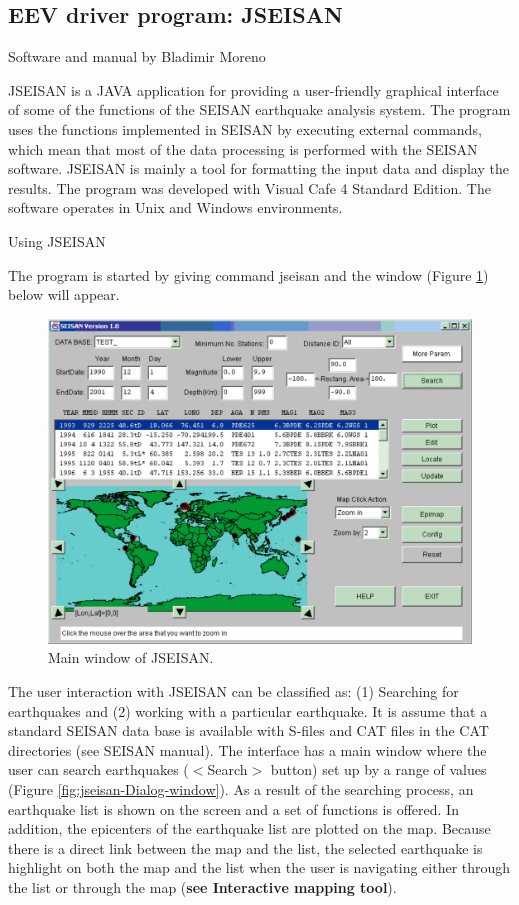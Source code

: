 \subsection{EEV driver program: JSEISAN}

Software and manual by Bladimir Moreno 

JSEISAN is a JAVA application for providing a user-friendly graphical interface of some of the functions of the SEISAN earthquake analysis system. The program uses the functions implemented in SEISAN by executing external commands, which mean that most of the data processing is performed with the SEISAN software. JSEISAN is mainly a tool for formatting the input data and display the results. The program was developed with Visual Cafe 4 Standard Edition. The software operates in Unix and Windows environments. 

Using JSEISAN 

The program is started by giving command jseisan and the window 
(Figure \ref{fig:jseisan}) below will appear. 

\begin{figure}
\centerline{\includegraphics[width=0.9\linewidth]{fig/fig6}}
\caption{Main window of JSEISAN.}
\label{fig:jseisan}
\end{figure}

The user interaction with JSEISAN can be classified as: (1) Searching for earthquakes and (2) working with a particular earthquake. It is assume that a standard SEISAN data base is available with S-files and CAT files in the CAT directories (see SEISAN manual). The interface has a main window where the user can search earthquakes ($<$Search$>$ button) set up by a range of values 
(Figure \ref{fig:jseisan-Dialog-window}). 
As a result of the searching process, an earthquake list is shown on the screen and a set of functions is offered. In addition, the epicenters of the earthquake list are plotted on the map. Because there is a direct link between the map and the list, the selected earthquake is highlight on both the map and the list when the user is navigating either through the list or through the map (\textbf{see Interactive mapping tool}). 

